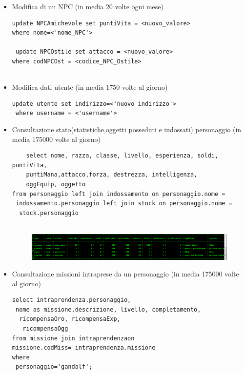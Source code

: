 \begin{itemize}
\begin{verbatim}
\end{verbatim}
\item Modifica di un NPC (in media 20 volte ogni mese)

\begin{verbatim}
update NPCAmichevole set puntiVita = <nuovo_valore>
where nome=<'nome_NPC'>

 update NPCOstile set attacco = <nuovo_valore>
where codNPCOst = <codice_NPC_Ostile>


\end{verbatim}
\item Modifica dati utente (in media 1750 volte al giorno)

\begin{verbatim}
update utente set indirizzo=<'nuovo_indirizzo'>
 where username = <'username'>

\end{verbatim}
\item Consultazione stato(statistiche,oggetti posseduti e indossati) personaggio (in media 175000 volte al giorno)
	
\begin{verbatim}
	select nome, razza, classe, livello, esperienza, soldi, puntiVita, 
	puntiMana,attacco,forza, destrezza, intelligenza,
	oggEquip, oggetto
from personaggio left join indossamento on personaggio.nome =
 indossamento.personaggio left join stock on personaggio.nome =
  stock.personaggio


\end{verbatim}

\begin{figure}[H]
\centering
\includegraphics[width=0.7\linewidth]{./immagini/immquery/1-statopersonaggio}
\caption{}
\label{fig:1-statopersonaggio}
\end{figure}

\item Consultazione missioni intraprese da un personaggio (in media 175000 volte al giorno)

\begin{verbatim}
select intraprendenza.personaggio,
 nome as missione,descrizione, livello, completamento,
  ricompensaOro, ricompensaExp,
   ricompensaOgg
from missione join intraprendenzaon 
missione.codMiss= intraprendenza.missione 
where
 personaggio='gandalf';

\end{verbatim}


\end{itemize}

